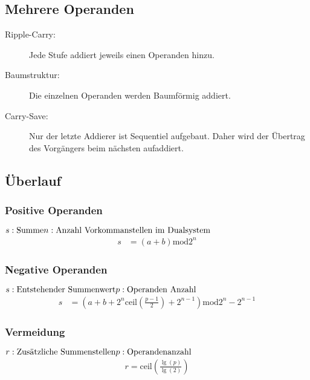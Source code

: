 \subsection{Mehrere Operanden}
\begin{description}
  	\item [Ripple-Carry:] 	Jede Stufe addiert jeweils einen Operanden hinzu.
	\item [Baumstruktur:] 	Die einzelnen Operanden werden Baumförmig addiert.
	\item [Carry-Save:]		Nur der letzte Addierer ist Sequentiel aufgebaut. Daher
							wird der Übertrag des Vorgängers beim nächsten aufaddiert.
\end{description}

\subsection{Überlauf}
\begin{multicols}{2}
	\subsubsection{Positive Operanden}
	\(
	s: \text{Summe}\\
	n: \text{Anzahl Vorkommanstellen im Dualsystem}
	\)
	\begin{align*}
	s&=\left(a+b\right)\text{mod} 2^n
	\end{align*}
	
	\subsubsection{Negative Operanden}
	\(
	s: \text{Entstehender Summenwert}\\
	p: \text{Operanden Anzahl}
	\)
	\begin{align*}
	s&=\left(a+b+2^n\text{ceil}\left(\frac{p-1}{2}\right)+2^{n-1}\right)\text{mod} 2^n-2^{n-1}
	\end{align*}
	
	\subsubsection{Vermeidung}
	\(
	r: \text{Zusätzliche Summenstellen}\\
	p: \text{Operandenanzahl}
	\)
	\begin{align*}
	r=\text{ceil}\left(\frac{\lg\left(p\right)}{\lg\left(2\right)}\right)
	\end{align*}	
\end{multicols}


